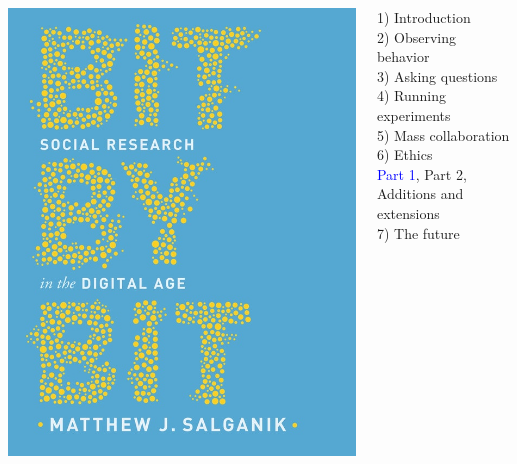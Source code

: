 \documentclass{beamer}
\begin{document}
\begin{frame}

\begin{columns}
\begin{column}{.40\textwidth}
\includegraphics[width=\textwidth]{figures/salganik_bit_2018_cover}
\end{column}%

\hfill%

\begin{column}{.60\textwidth}
1) Introduction \\
2) Observing behavior \\
3) Asking questions \\
4) Running experiments \\
5) Mass collaboration \\
6) Ethics \\
\textcolor{blue}{Part 1}, Part 2, Additions and extensions \\
7) The future \\
\end{column}%
\end{columns}

\end{frame}
\end{document}
